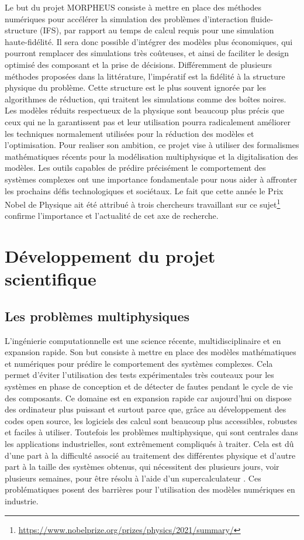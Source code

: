 \documentclass[12pt, french]{article}
\begin{document}
Le but du projet MORPHEUS consiste à mettre en place des méthodes numériques
pour accélérer la simulation des problèmes d'interaction fluide-structure (IFS), par rapport au temps de calcul requis pour une simulation haute-fidélité. Il sera donc possible d’intégrer des modèles plus économiques, qui pourront remplacer des simulations très coûteuses, et ainsi de faciliter le design optimisé des composant et la prise de décisions. Différemment de plusieurs méthodes proposées dans la littérature, l'impératif est la fidélité à la structure physique du problème.  Cette structure est le plus souvent ignorée par les algorithmes de réduction, qui traitent les simulations comme des boîtes noires. Les modèles réduits respectueux de la physique sont beaucoup plus précis que ceux qui ne la garantissent pas et leur utilisation pourra radicalement améliorer les techniques normalement utilisées pour la réduction des modèles et l'optimisation. Pour realiser son ambition, ce projet vise à utiliser des formalismes mathématiques récents pour la modélisation multiphysique et la digitalisation des modèles. Les outils capables de prédire précisément le comportement des systèmes complexes ont une importance fondamentale pour nous aider à affronter les prochains défis technologiques et sociétaux. Le fait que cette année le Prix Nobel de Physique ait été attribué à trois chercheurs travaillant sur ce sujet\footnote{\url{https://www.nobelprize.org/prizes/physics/2021/summary/}} confirme
l’importance et l'actualité de cet axe de recherche.


\section{Développement du projet scientifique}

\subsection{Les problèmes multiphysiques}
L'ingénierie computationnelle est une science récente, multidisciplinaire et en expansion rapide. Son but consiste à mettre en place des modèles mathématiques et numériques pour prédire le comportement des systèmes complexes. Cela permet d'éviter l'utilisation des tests expérimentales très couteaux pour les systèmes en phase de conception et de détecter de fautes pendant le cycle de vie des composants. Ce domaine est en expansion rapide car aujourd'hui on dispose des ordinateur plus puissant et surtout parce que, grâce au développement des codes open source, les logiciels des calcul sont beaucoup plus accessibles, robustes et faciles à utiliser. Toutefois les problèmes multiphysique, qui sont centrales dans les applications industrielles, sont extrêmement compliqués à traiter. Cela est d\^u d'une part à la difficulté associé au traitement des différentes physique et d'autre part à la taille des systèmes obtenus, qui nécessitent des plusieurs jours, voir plusieurs semaines, pour être résolu à l'aide d'un supercalculateur \cite{keyes2013}. Ces problématiques posent des barrières pour l'utilisation des modèles numériques en industrie. 
\end{document}

